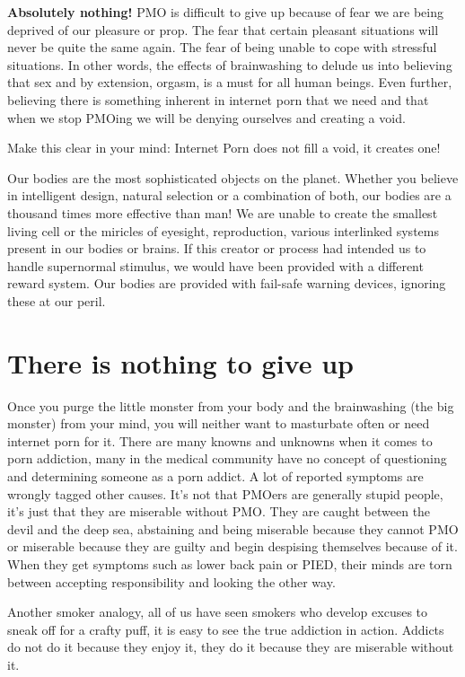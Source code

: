 \documentclass[easypeasy.tex]{subfiles}
\begin{document}
\textbf{Absolutely nothing!} PMO is difficult to give up because of fear we are being deprived of our pleasure or prop. The fear that certain pleasant situations will never be quite the same again. The fear of being unable to cope with stressful situations. In other words, the effects of brainwashing to delude us into believing that sex and by extension, orgasm, is a must for all human beings. Even further, believing there is something inherent in internet porn that we need and that when we stop PMOing we will be denying ourselves and creating a void.

Make this clear in your mind:
  {\huge Internet Porn does not fill a void, it creates one!}

Our bodies are the most sophisticated objects on the planet. Whether you believe in intelligent design, natural selection or a combination of both, our bodies are a thousand times more effective than man! We are unable to create the smallest living cell or the miricles of eyesight, reproduction, various interlinked systems present in our bodies or brains. If this creator or process had intended us to handle supernormal stimulus, we would have been provided with a different reward system. Our bodies are provided with fail-safe warning devices, ignoring these at our peril.

\section{There is nothing to give up}
Once you purge the little monster from your body and the brainwashing (the big monster) from your mind, you will neither want to masturbate often or need internet porn for it. There are many knowns and unknowns when it comes to porn addiction, many in the medical community have no concept of questioning and determining someone as a porn addict. A lot of reported symptoms are wrongly tagged other causes. It's not that PMOers are generally stupid people, it's just that they are miserable without PMO. They are caught between the devil and the deep sea, abstaining and being miserable because they cannot PMO or miserable because they are guilty and begin despising themselves because of it. When they get symptoms such as lower back pain or PIED, their minds are torn between accepting responsibility and looking the other way.

Another smoker analogy, all of us have seen smokers who develop excuses to sneak off for a crafty puff, it is easy to see the true addiction in action. Addicts do not do it because they enjoy it, they do it because they are miserable without it.
\end{document}
